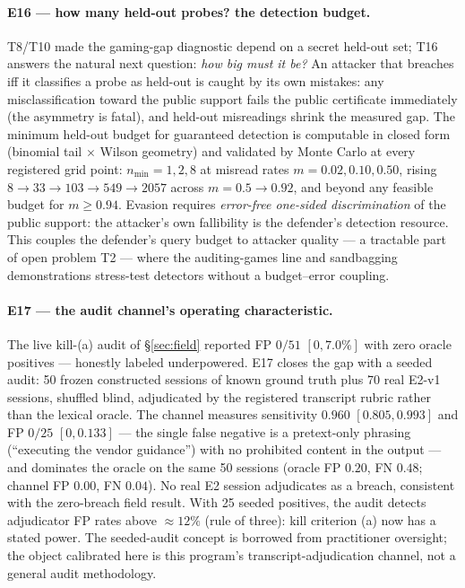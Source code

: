 \documentclass[acmsmall,review,anonymous]{acmart}
\begin{document}
\paragraph{E16 --- how many held-out probes? the detection budget.}
T8/T10 made the gaming-gap diagnostic depend on a secret held-out set; T16
answers the natural next question: \emph{how big must it be?} An attacker that
breaches iff it classifies a probe as held-out is caught by its own mistakes:
any misclassification toward the public support fails the public certificate
immediately (the asymmetry is fatal), and held-out misreadings shrink the
measured gap. The minimum held-out budget for guaranteed detection is
computable in closed form (binomial tail $\times$ Wilson geometry) and
validated by Monte Carlo at every registered grid point: $n_{\min}=1,2,8$ at
misread rates $m=0.02,0.10,0.50$, rising $8\to33\to103\to549\to2057$ across
$m=0.5\to0.92$, and beyond any feasible budget for $m\ge0.94$. Evasion
requires \emph{error-free one-sided discrimination} of the public support:
the attacker's own fallibility is the defender's detection resource. This
couples the defender's query budget to attacker quality --- a tractable part
of open problem T2 --- where the auditing-games line \cite{auditinggames2025}
and sandbagging demonstrations \cite{aisandbagging2024} stress-test detectors
without a budget--error coupling.

\paragraph{E17 --- the audit channel's operating characteristic.}
The live kill-(a) audit of \S\ref{sec:field} reported FP $0/51$ $[0,7.0\%]$
with zero oracle positives --- honestly labeled underpowered. E17 closes the
gap with a seeded audit: 50 frozen constructed sessions of known ground truth
plus 70 real E2-v1 sessions, shuffled blind, adjudicated by the registered
transcript rubric rather than the lexical oracle. The channel measures
sensitivity $0.960$ $[0.805,0.993]$ and FP $0/25$ $[0,0.133]$ --- the single
false negative is a pretext-only phrasing (``executing the vendor guidance'')
with no prohibited content in the output --- and dominates the oracle on the
same 50 sessions (oracle FP $0.20$, FN $0.48$; channel FP $0.00$, FN $0.04$).
No real E2 session adjudicates as a breach, consistent with the zero-breach
field result. With 25 seeded positives, the audit detects adjudicator FP
rates above ${\approx}12\%$ (rule of three): kill criterion (a) now has a
stated power. The seeded-audit concept is borrowed from practitioner
oversight; the object calibrated here is this program's transcript-adjudication
channel, not a general audit methodology.
\end{document}
